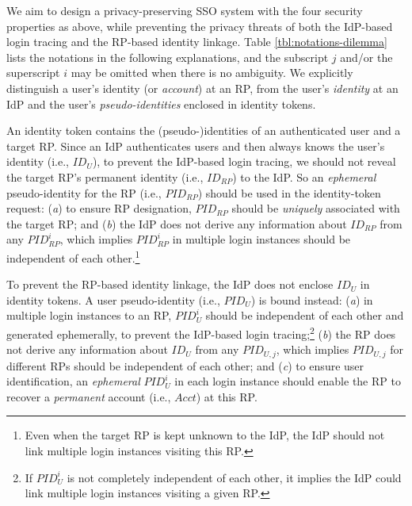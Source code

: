 We aim to design a privacy-preserving SSO system with the four security properties as above,
    while preventing the privacy threats of both the IdP-based login tracing and the RP-based identity linkage.
Table \ref{tbl:notations-dilemma} lists the notations in the following explanations,
    and the subscript $j$ and/or the superscript $i$ may be omitted when there is no ambiguity.
We explicitly distinguish a user's identity (or \emph{account}) at an RP,
     from the user's \emph{identity} at an IdP and the user's \emph{pseudo-identities} enclosed in identity tokens.

An identity token contains the (pseudo-)identities of an authenticated user and a target RP. %
Since an IdP authenticates users and then always knows the user's identity (i.e., $ID_U$),
    to prevent the IdP-based login tracing,
    we should not reveal the target RP's permanent identity (i.e., $ID_{RP}$) to the IdP.
So an \emph{ephemeral} pseudo-identity for the RP (i.e., $PID_{RP}$) should be used in the identity-token request:
(\emph{a}) to ensure RP designation,
     $PID_{RP}$ should be \emph{uniquely} associated with the target RP;
    and (\emph{b}) the IdP does not derive any information about $ID_{RP}$ from any $PID_{RP}^i$,
        which implies $PID_{RP}^i$ in multiple login instances should
         be independent of each other.\footnote{Even when the target RP is kept unknown to the IdP,
            the IdP should not link multiple login instances visiting this RP.}

To prevent the RP-based identity linkage,
 the IdP does not enclose $ID_U$ in identity tokens.
A user pseudo-identity (i.e., $PID_U$) is bound instead:
    (\emph{a}) in multiple login instances to an RP, $PID_U^i$ should be independent of each other and generated ephemerally,
        to prevent the IdP-based login tracing;\footnote{If $PID_U^i$ is not completely independent of each other,
         it implies the IdP could link multiple login instances visiting a given RP.}
    (\emph{b}) the RP does not derive any information about $ID_U$ from any $PID_{U,j}$,
    which implies $PID_{U,j}$ for different RPs should be independent of each other;
    and (\emph{c}) to ensure user identification,
    an \emph{ephemeral} $PID_{U}^i$ in each login instance should enable the RP to recover a \emph{permanent} account  (i.e., $Acct$) at this RP.



